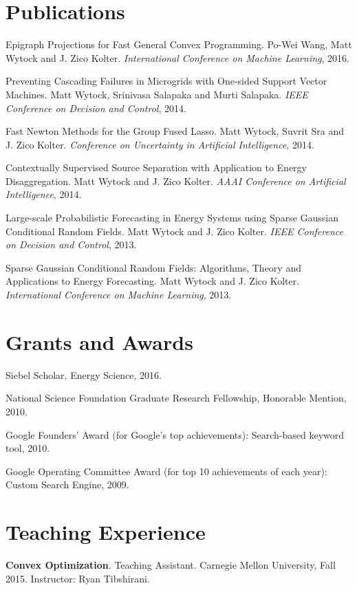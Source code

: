 \documentclass[margin, line]{res}
\begin{document}
\begin{resume}
\section{Publications}

Epigraph Projections for Fast General Convex Programming. Po-Wei Wang, Matt
Wytock and J. Zico Kolter. \emph{International Conference on Machine Learning},
2016.

Preventing Cascading Failures in Microgrids with One-sided Support Vector
Machines. Matt Wytock, Srinivasa Salapaka and Murti Salapaka. \emph{IEEE
Conference on Decision and Control}, 2014.

Fast Newton Methods for the Group Fused Lasso. Matt Wytock, Suvrit Sra and
J. Zico Kolter. \emph{Conference on Uncertainty in Artificial Intelligence}, 2014.

Contextually Supervised Source Separation with Application to Energy
Disaggregation. Matt Wytock and J. Zico Kolter. \emph{AAAI Conference on Artificial
Intelligence}, 2014.

Large-scale Probabilistic Forecasting in Energy Systems using Sparse Gaussian
Conditional Random Fields. Matt Wytock and J. Zico Kolter. \emph{IEEE Conference
on Decision and Control}, 2013.

Sparse Gaussian Conditional Random Fields: Algorithms, Theory and Applications
to Energy Forecasting. Matt Wytock and J. Zico Kolter. \emph{International Conference
on Machine Learning}, 2013.

\section{Grants and Awards}

Siebel Scholar, Energy Science, 2016.

National Science Foundation Graduate Research Fellowship, Honorable Mention,
2010.

Google Founders' Award (for Google's top achievements): Search-based keyword
tool, 2010.

Google Operating Committee Award (for top 10 achievements of each year): Custom Search Engine, 2009.

\section{Teaching Experience}

{\bf Convex Optimization}. Teaching Assistant. Carnegie Mellon University, Fall
2015. Instructor: Ryan Tibshirani.


\end{resume}
\end{document}

